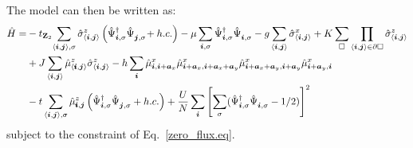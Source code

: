 The model  can then be written as:
\begin{align}
	\hat{H} =& - t_{\Ztwo}\! \sum_{\langle \vec{i}, \vec{j} \rangle, \sigma } \hat{\sigma}^z_{\langle \vec{i}, \vec{j} \rangle}
	\left(\hat{\Psi}^{\dagger}_{\vec{i},\sigma} \hat{\Psi}^{\phantom{\dagger}}_{\vec{j},\sigma} \!+ h.c. \right) - \mu \sum_{\vec{i},\sigma} \hat{\Psi}^{\dagger}_{\vec{i},\sigma} \hat{\Psi}^{\phantom{\dagger}}_{\vec{i},\sigma}  
	-g \sum_{\langle \vec{i}, \vec{j} \rangle } \hat{\sigma}^{x}_{\langle \vec{i}, \vec{j} \rangle }  +
	  K \sum_{\square} \prod_{\langle \vec{i}, \vec{j} \rangle \in \partial \square} \hat{\sigma}^{z}_{\langle \vec{i}, \vec{j} \rangle}  \nonumber \\
	& + J  \sum_{\langle \vec{i}, \vec{j} \rangle}  \hat{\mu}^z_{ \langle \pmb{i}, \ve{j} \rangle }  \hat{\sigma}^{z}_{\langle \vec{i}, \vec{j} \rangle}    
	      -  h \sum_{ \vec{i} } \hat{\mu}^{x}_{\ve{i},\ve{i} + \ve{a}_x } \hat{\mu}^{x}_{\ve{i} + \ve{a}_x, \ve{i} + \ve{a}_x + \ve{a}_y }   \hat{\mu}^{x}_{\ve{i} + \ve{a}_x + \ve{a}_y, \ve{i} + \ve{a}_y  }
	         \hat{\mu}^{x}_{\ve{i} + \ve{a}_y, \ve{i}  }	\nonumber  \\      
	&        - t  \sum_{\langle \vec{i}, \vec{j} \rangle, \sigma }   \hat{\mu}^z_{\pmb{i},\ve{j}}    \left( \hat{\Psi}^{\dagger}_{\vec{i},\sigma} \hat{\Psi}^{\phantom{\dagger}}_{\vec{j},\sigma} 	+ h.c. \right) + \frac{U}{N}\sum_{\ve{i}} \left[ \sum_{\sigma}  ( \hat{\Psi}^{\dagger}_{\ve{i},\sigma}  \hat{\Psi}^{\phantom\dagger}_{\ve{i},\sigma} - 1/2 ) \right]^2 
\end{align}  
subject to the constraint of Eq.~\eqref{zero_flux.eq}.  

